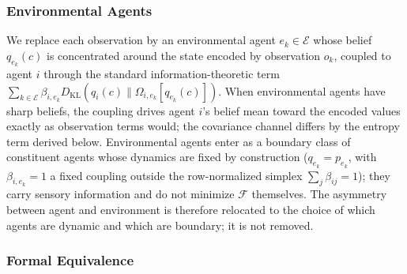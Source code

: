\documentclass[11pt]{article}
\begin{document}
\subsubsection{Environmental Agents}

We replace each observation by an environmental agent $e_k \in \mathcal{E}$ whose belief $q_{e_k}(c)$ is concentrated around the state encoded by observation $o_k$, coupled to agent $i$ through the standard information-theoretic term $\sum_{k \in \mathcal{E}} \beta_{i,e_k}  D_{\mathrm{KL}}(q_i(c) \| \Omega_{i,e_k}[q_{e_k}(c)])$. When environmental agents have sharp beliefs, the coupling drives agent $i$'s belief mean toward the encoded values exactly as observation terms would; the covariance channel differs by the entropy term derived below. Environmental agents enter as a boundary class of constituent agents whose dynamics are fixed by construction ($q_{e_k} = p_{e_k}$, with $\beta_{i,e_k} = 1$ a fixed coupling outside the row-normalized simplex $\sum_j \beta_{ij} = 1$); they carry sensory information and do not minimize $\mathcal{F}$ themselves. The asymmetry between agent and environment is therefore relocated to the choice of which agents are dynamic and which are boundary; it is not removed.

\subsubsection{Formal Equivalence}
\end{document}

